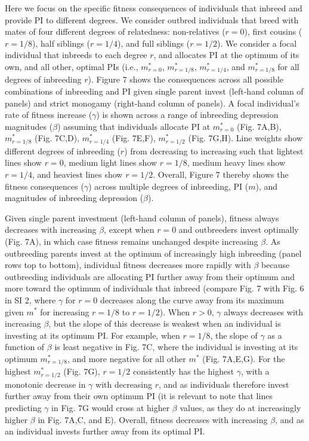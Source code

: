 \documentclass[12pt]{article}
\begin{document}
Here we focus on the specific fitness consequences of individuals that inbreed and provide PI to different degrees. We consider outbred individuals that breed with mates of four different degrees of relatedness: non-relatives ($r=0$), first cousins ($r=1/8$), half siblings ($r=1/4$), and full siblings ($r=1/2$). We consider a focal individual that inbreeds to each degree $r$, and allocates PI at the optimum of its own, and all other, optimal PIs (i.e., $m^{*}_{r=0}$, $m^{*}_{r=1/8}$, $m^{*}_{r=1/4}$, and $m^{*}_{r=1/8}$ for all degrees of inbreeding $r$). Figure 7 shows the consequences across all possible combinations of inbreeding and PI given single parent invest (left-hand column of panels) and strict monogamy (right-hand column of panels). A focal individual's rate of fitness increase ($\gamma$) is shown across a range of inbreeding depression magnitudes ($\beta$) assuming that individuals allocate PI at $m^{*}_{r=0}$ (Fig. 7A,B), $m^{*}_{r=1/8}$ (Fig. 7C,D), $m^{*}_{r=1/4}$ (Fig. 7E,F), $m^{*}_{r=1/2}$ (Fig. 7G,H). Line weights show different degrees of inbreeding ($r$) from decreasing to increasing such that lightest lines show $r=0$, medium light lines show $r=1/8$, medium heavy lines show $r=1/4$, and heaviest lines show $r=1/2$. Overall, Figure 7 thereby shows the fitness consequences ($\gamma$) across multiple degrees of inbreeding, PI ($m$), and magnitudes of inbreeding depression ($\beta$).

Given single parent investment (left-hand column of panels), fitness always decreases with increasing $\beta$, except when $r=0$ and outbreeders invest optimally (Fig. 7A), in which case fitness remains unchanged despite increasing $\beta$. As outbreeding parents invest at the optimum of increasingly high inbreeding (panel rows top to bottom), individual fitness decreases more rapidly with $\beta$ because outbreeding individuals are allocating PI further away from their optimum and more toward the optimum of individuals that inbreed (compare Fig. 7 with Fig. 6 in SI 2, where $\gamma$ for $r=0$ decreases along the curve away from its maximum given $m^{*}$ for increasing $r=1/8$ to $r=1/2$). When $r>0$, $\gamma$ always decreases with increasing $\beta$, but the slope of this decrease is weakest when an individual is investing at its optimum PI. For example, when $r=1/8$, the slope of $\gamma$ as a function of $\beta$ is least negative in Fig. 7C, where the individual is investing at its optimum $m^{*}_{r=1/8}$, and more negative for all other $m^{*}$ (Fig. 7A,E,G). For the highest $m^{*}_{r=1/2}$ (Fig. 7G), $r=1/2$ consistently has the highest $\gamma$, with a monotonic decrease in $\gamma$ with decreasing $r$, and as individuals therefore invest further away from their own optimum PI (it is relevant to note that lines predicting $\gamma$ in Fig. 7G would cross at higher $\beta$ values, as they do at increasingly higher $\beta$ in Fig. 7A,C, and E). Overall, fitness decreases with increasing $\beta$, and as an individual invests further away from its optimal PI.
\end{document}
